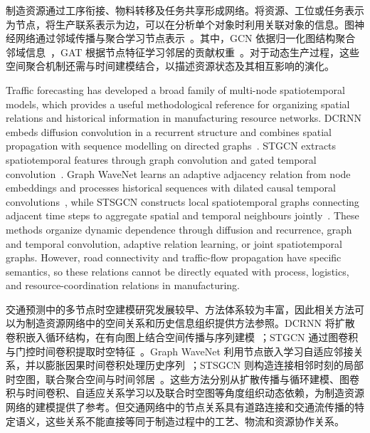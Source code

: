 \documentclass[a4paper,fleqn]{cas-dc}
\newcommand{\zhpara}[1]{%
  \par\begingroup\small\color{black!72}\noindent #1\par\endgroup}
\begin{document}
\zhpara{制造资源通过工序衔接、物料转移及任务共享形成网络。将资源、工位或任务表示为节点，将生产联系表示为边，可以在分析单个对象时利用关联对象的信息。图神经网络通过邻域传播与聚合学习节点表示~\cite{wu2021gnn}。其中，GCN 依据归一化图结构聚合邻域信息~\cite{kipf2017gcn}，GAT 根据节点特征学习邻居的贡献权重~\cite{velickovic2018gat}。对于动态生产过程，这些空间聚合机制还需与时间建模结合，以描述资源状态及其相互影响的演化。}

Traffic forecasting has developed a broad family of multi-node spatiotemporal models, which provides a useful methodological reference for organizing spatial relations and historical information in manufacturing resource networks. DCRNN embeds diffusion convolution in a recurrent structure and combines spatial propagation with sequence modelling on directed graphs~\cite{li2018dcrnn}. STGCN extracts spatiotemporal features through graph convolution and gated temporal convolution~\cite{yu2018stgcn}. Graph WaveNet learns an adaptive adjacency relation from node embeddings and processes historical sequences with dilated causal temporal convolutions~\cite{wu2019graphwavenet}, while STSGCN constructs local spatiotemporal graphs connecting adjacent time steps to aggregate spatial and temporal neighbours jointly~\cite{song2020stsgcn}. These methods organize dynamic dependence through diffusion and recurrence, graph and temporal convolution, adaptive relation learning, or joint spatiotemporal graphs. However, road connectivity and traffic-flow propagation have specific semantics, so these relations cannot be directly equated with process, logistics, and resource-coordination relations in manufacturing.

\zhpara{交通预测中的多节点时空建模研究发展较早、方法体系较为丰富，因此相关方法可以为制造资源网络中的空间关系和历史信息组织提供方法参照。DCRNN 将扩散卷积嵌入循环结构，在有向图上结合空间传播与序列建模~\cite{li2018dcrnn}；STGCN 通过图卷积与门控时间卷积提取时空特征~\cite{yu2018stgcn}。Graph WaveNet 利用节点嵌入学习自适应邻接关系，并以膨胀因果时间卷积处理历史序列~\cite{wu2019graphwavenet}；STSGCN 则构造连接相邻时刻的局部时空图，联合聚合空间与时间邻居~\cite{song2020stsgcn}。这些方法分别从扩散传播与循环建模、图卷积与时间卷积、自适应关系学习以及联合时空图等角度组织动态依赖，为制造资源网络的建模提供了参考。但交通网络中的节点关系具有道路连接和交通流传播的特定语义，这些关系不能直接等同于制造过程中的工艺、物流和资源协作关系。}
\end{document}
